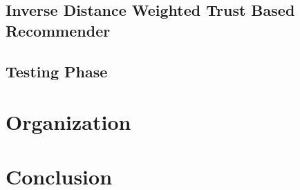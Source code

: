 \documentclass[12pt]{article}
\begin{document}
	\subsection{Inverse Distance Weighted Trust Based Recommender}
	
	
	\subsection{Testing Phase}
	
	
	\section{Organization}
	
	
	\section{Conclusion}
	
	
	
	
	
	
\end{document}
